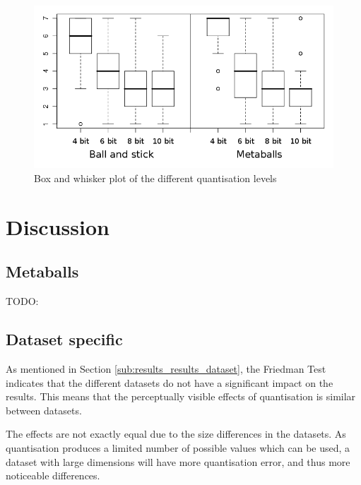 \begin{figure}[h!]
  \begin{center}
    \includegraphics[width=120mm]{boxwhisker_all_both}
  \end{center}
  \caption{Box and whisker plot of the different quantisation levels}
  \label{fig:results_boxwhisker_all}
\end{figure}



\section{Discussion}
\label{sec:results_discussion}

\subsection{Metaballs}
\label{sub:results_discussion_metaballs}

TODO:


\subsection{Dataset specific}
\label{sub:results_discussion_dataset}

As mentioned in Section \ref{sub:results_results_dataset}, the Friedman
Test indicates that the different datasets do not have a significant impact on
the results. This means that the perceptually visible effects of quantisation
is similar between datasets.

The effects are not exactly equal due to the size differences in the datasets.
As quantisation produces a limited number of possible values which can be used,
a dataset with large dimensions will have more quantisation error, and thus
more noticeable differences.

